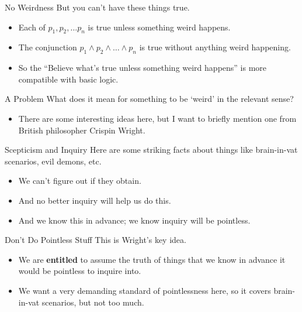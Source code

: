 \documentclass[
  17pt,
  letterpaper,
  ignorenonframetext,
  aspectratio=169,
  handout]{beamer}
\providecommand{\tightlist}{%
  \setlength{\itemsep}{0pt}\setlength{\parskip}{0pt}}\usepackage{longtable,booktabs,array}
\begin{document}
\begin{frame}{No Weirdness}
\protect\hypertarget{no-weirdness}{}
But you can't have these things true.

\begin{itemize}[<+->]
\tightlist
\item
  Each of \(p_1, p_2, \dots p_n\) is true unless something weird
  happens.
\item
  The conjunction \(p_1 \wedge p_2 \wedge \dots \wedge p_n\) is true
  without anything weird happening.
\item
  So the ``Believe what's true unless something weird happens'' is more
  compatible with basic logic.
\end{itemize}
\end{frame}

\begin{frame}{A Problem}
\protect\hypertarget{a-problem}{}
What does it mean for something to be `weird' in the relevant sense?

\begin{itemize}[<+->]
\tightlist
\item
  There are some interesting ideas here, but I want to briefly mention
  one from British philosopher Crispin Wright.
\end{itemize}
\end{frame}

\begin{frame}{Scepticism and Inquiry}
\protect\hypertarget{scepticism-and-inquiry}{}
Here are some striking facts about things like brain-in-vat scenarios,
evil demons, etc.

\begin{itemize}[<+->]
\tightlist
\item
  We can't figure out if they obtain.
\item
  And no better inquiry will help us do this.
\item
  And we know this in advance; we know inquiry will be pointless.
\end{itemize}
\end{frame}

\begin{frame}{Don't Do Pointless Stuff}
\protect\hypertarget{dont-do-pointless-stuff}{}
This is Wright's key idea.

\begin{itemize}[<+->]
\tightlist
\item
  We are \textbf{entitled} to assume the truth of things that we know in
  advance it would be pointless to inquire into.
\item
  We want a very demanding standard of pointlessness here, so it covers
  brain-in-vat scenarios, but not too much.
\end{itemize}
\end{frame}
\end{document}
